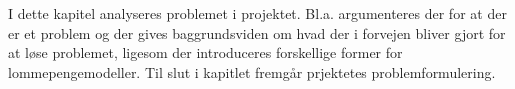I dette kapitel analyseres problemet i projektet. Bl.a. argumenteres der for at der er et problem og der gives baggrundsviden om hvad der i forvejen bliver gjort for at løse problemet, ligesom der introduceres forskellige former for lommepengemodeller. Til slut i kapitlet fremgår prjektetes problemformulering.